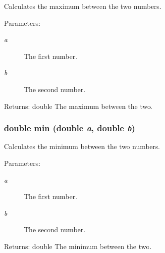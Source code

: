 Calculates the maximum between the two numbers. 

\begin{Desc}
\item[Parameters:]
\begin{description}
\item[{\em a}]The first number. \item[{\em b}]The second number. \end{description}
\end{Desc}
\begin{Desc}
\item[Returns:]double The maximum between the two. \end{Desc}
\hypertarget{group__userclasses_g82fe34140a419a1f19200091b808e4ad}{
\subsubsection[{min}]{\setlength{\rightskip}{0pt plus 5cm}double min (double {\em a}, \/  double {\em b})}}
\label{group__userclasses_g82fe34140a419a1f19200091b808e4ad}


Calculates the minimum between the two numbers. 

\begin{Desc}
\item[Parameters:]
\begin{description}
\item[{\em a}]The first number. \item[{\em b}]The second number. \end{description}
\end{Desc}
\begin{Desc}
\item[Returns:]double The minimum between the two. \end{Desc}
